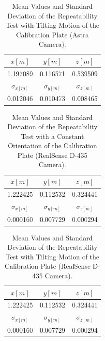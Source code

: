 \begin{table}[ht]
\renewcommand{\arraystretch}{1.3}
\caption{Mean Values and Standard Deviation of the Repeatability Test with Tilting Motion of the Calibration Plate (Astra Camera).}
\label{meanastra2}
\centering
\begin{tabular}{|c|c|c|}
\hline
$x[m]$ & $y[m]$ & $z[m]$ \\
\hline
1.197089&	0.116571&	0.539509 \\
\hline
\hline
$\sigma_{x[m]}$ & $\sigma_{y[m]}$ & $\sigma_{z[m]}$\\
\hline
0.012046&	0.010473&	0.008465\\
\hline
\end{tabular}
\end{table}



\begin{table}[ht]
\renewcommand{\arraystretch}{1.3}
\caption{Mean Values and Standard Deviation of the Repeatability Test with a Constant Orientation of the Calibration Plate (RealSense D-435 Camera).}
\label{meanreal1}
\centering
\begin{tabular}{|c|c|c|}
\hline
$x[m]$ & $y[m]$ & $z[m]$ \\
\hline
1.222425&	0.112532&	0.324441 \\
\hline
\hline
$\sigma_{x[m]}$ & $\sigma_{y[m]}$ & $\sigma_{z[m]}$ \\
\hline
0.000160&	0.007729&	0.000294\\
\hline
\end{tabular}
\end{table}




\begin{table}[ht]
\renewcommand{\arraystretch}{1.3}
\caption{Mean Values and Standard Deviation  of the Repeatability Test with Tilting Motion of the Calibration Plate (RealSense D-435 Camera).}
\label{meanreal2}
\centering
\begin{tabular}{|c|c|c|}
\hline
$x[m]$ & $y[m]$ & $z[m]$ \\
\hline
1.222425&	0.112532&	0.324441 \\
\hline
\hline
$\sigma_{x[m]}$ & $\sigma_{y[m]}$ & $\sigma_{z[m]}$ \\
\hline
0.000160&	0.007729&	0.000294\\
\hline
\end{tabular}
\end{table}


